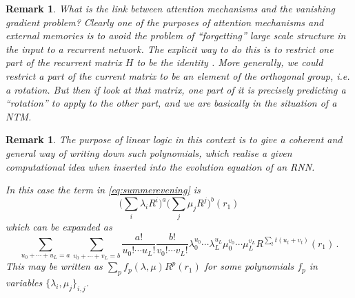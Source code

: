 \documentclass[english,letter paper,12pt,leqno]{article}
\theoremstyle{example}
\newtheorem{remark}[theorem]{Remark}
\numberwithin{equation}{section}
\def\be{\begin{equation}}
\def\ee{\end{equation}}
\begin{document}
\begin{remark} What is the link between attention mechanisms and the vanishing gradient problem? Clearly one of the purposes of attention mechanisms and external memories is to avoid the problem of ``forgetting'' large scale structure in the input to a recurrent network. The explicit way to do this is to restrict one part of the recurrent matrix $H$ to be the identity \cite{mikolovmemory}. More generally, we could restrict a part of the current matrix to be an element of the orthogonal group, i.e. a rotation. But then if look at that matrix, one part of it is precisely predicting a ``rotation'' to apply to the other part, and we are basically in the situation of a NTM.
\end{remark}



\begin{remark} The purpose of linear logic in this context is to give a coherent and general way of writing down such polynomials, which realise a given computational idea when inserted into the evolution equation of an RNN.

In this case the term in \eqref{eq:summerevening} is
\be\label{eq:crazyhorse_alt}
\big( \sum_i \lambda_i R^{i} \big)^a \big( \sum_j \mu_j R^{j} \big)^b (r_1)
\ee 
which can be expanded as
\be
\sum_{u_0 + \cdots + u_L = a}\sum_{v_0 + \cdots + v_L = b} \frac{a!}{u_0! \cdots u_L!} \frac{b!}{v_0! \cdots v_L!} \lambda_0^{u_0} \cdots \lambda_L^{u_L} \mu_0^{v_0} \cdots \mu_L^{v_L}  R^{\sum_t t (u_t + v_t)}(r_1)\,.
\ee
This may be written as $\sum_p f_p(\lambda, \mu) R^p(r_1)$ for some polynomials $f_p$ in variables $\{ \lambda_i, \mu_j \}_{i,j}$. 
\end{remark}
\end{document}
